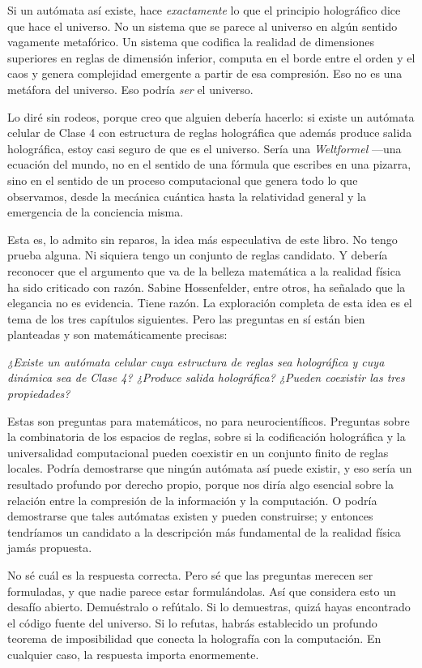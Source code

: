 \documentclass[11pt, twoside, openright]{book}
\begin{document}
Si un autómata así existe, hace \textit{exactamente} lo que el principio holográfico dice que hace el universo. No un sistema que se parece al universo en algún sentido vagamente metafórico. Un sistema que codifica la realidad de dimensiones superiores en reglas de dimensión inferior, computa en el borde entre el orden y el caos y genera complejidad emergente a partir de esa compresión. Eso no es una metáfora del universo. Eso podría \textit{ser} el universo.

Lo diré sin rodeos, porque creo que alguien debería hacerlo: si existe un autómata celular de Clase 4 con estructura de reglas holográfica que además produce salida holográfica, estoy casi seguro de que es el universo. Sería una \textit{Weltformel} ---una ecuación del mundo, no en el sentido de una fórmula que escribes en una pizarra, sino en el sentido de un proceso computacional que genera todo lo que observamos, desde la mecánica cuántica hasta la relatividad general y la emergencia de la conciencia misma.

Esta es, lo admito sin reparos, la idea más especulativa de este libro. No tengo prueba alguna. Ni siquiera tengo un conjunto de reglas candidato. Y debería reconocer que el argumento que va de la belleza matemática a la realidad física ha sido criticado con razón. Sabine Hossenfelder, entre otros, ha señalado que la elegancia no es evidencia. Tiene razón. La exploración completa de esta idea es el tema de los tres capítulos siguientes. Pero las preguntas en sí están bien planteadas y son matemáticamente precisas:

\textit{¿Existe un autómata celular cuya estructura de reglas sea holográfica y cuya dinámica sea de Clase 4? ¿Produce salida holográfica? ¿Pueden coexistir las tres propiedades?}

Estas son preguntas para matemáticos, no para neurocientíficos. Preguntas sobre la combinatoria de los espacios de reglas, sobre si la codificación holográfica y la universalidad computacional pueden coexistir en un conjunto finito de reglas locales. Podría demostrarse que ningún autómata así puede existir, y eso sería un resultado profundo por derecho propio, porque nos diría algo esencial sobre la relación entre la compresión de la información y la computación. O podría demostrarse que tales autómatas existen y pueden construirse; y entonces tendríamos un candidato a la descripción más fundamental de la realidad física jamás propuesta.

No sé cuál es la respuesta correcta. Pero sé que las preguntas merecen ser formuladas, y que nadie parece estar formulándolas. Así que considera esto un desafío abierto. Demuéstralo o refútalo. Si lo demuestras, quizá hayas encontrado el código fuente del universo. Si lo refutas, habrás establecido un profundo teorema de imposibilidad que conecta la holografía con la computación. En cualquier caso, la respuesta importa enormemente.
\end{document}

